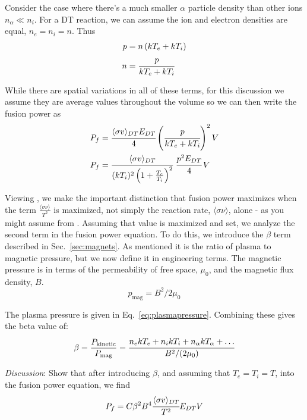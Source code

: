 \documentclass[11pt]{report} %
\begin{document}
Consider the case where there's a much smaller $\alpha$ particle density than other ions $n_\alpha \ll n_i$. For a DT reaction, we can assume the ion and electron densities are equal, $n_e = n_i = n$. Thus
\begin{align}
p &= n\left(kT_e + kT_i\right)\nonumber\\
n & = \cfrac{p}{kT_e + kT_i}
\end{align}

While there are spatial variations in all of these terms, for this discussion we assume they are average values throughout the volume so we can then write the fusion power as
\begin{align}\label{eq:fusion-power}
P_f & =\cfrac{\langle\sigma v\rangle_{DT} E_{DT}}{4}\left( \cfrac{p}{kT_e + kT_i}\right)^2 V\nonumber\\
P_f & = \cfrac{\langle\sigma v\rangle_{DT}}{(kT_i)^2\left(1 + \frac{T_e}{T_i}\right)^2}~\cfrac{p^2E_{DT}}{4}\,V
\end{align}

Viewing , we make the important distinction that fusion power maximizes when the term $\frac{\langle\sigma\nu\rangle}{T^2}$ is maximized, not simply the reaction rate, $\langle \sigma \nu \rangle$, alone - as you might assume from . Assuming that value is maximized and set, we analyze the second term in the fusion power equation. To do this, we introduce the $\beta$ term described in Sec.~\ref{sec:magnets}. As mentioned it is the ratio of plasma to magnetic pressure, but we now define it in engineering terms. The magnetic pressure is in terms of the permeability of free space, $\mu_0$, and the magnetic flux density, $B$.
\begin{equation}
p_\text{mag} = B^2/2\mu_0
\end{equation}

The plasma pressure is given in Eq.~\ref{eq:plasmapressure}. Combining these gives the beta value of:
\begin{equation}
\beta = \frac{P_\text{kinetic}}{P_\text{mag}} = \cfrac{n_ekT_e + n_ikT_i + n_\alpha kT_\alpha + \dots}{B^2/(2\mu_0)}
\end{equation}

{\it Discussion}: Show that after introducing $\beta$, and assuming that $T_e = T_i = T$, into the fusion power equation, we find
\begin{equation}\label{eq:fusionPower}
P_f = C\beta^2B^4\cfrac{\langle\sigma v\rangle_{DT}}{T^2}E_{DT}V
\end{equation}
\end{document}
